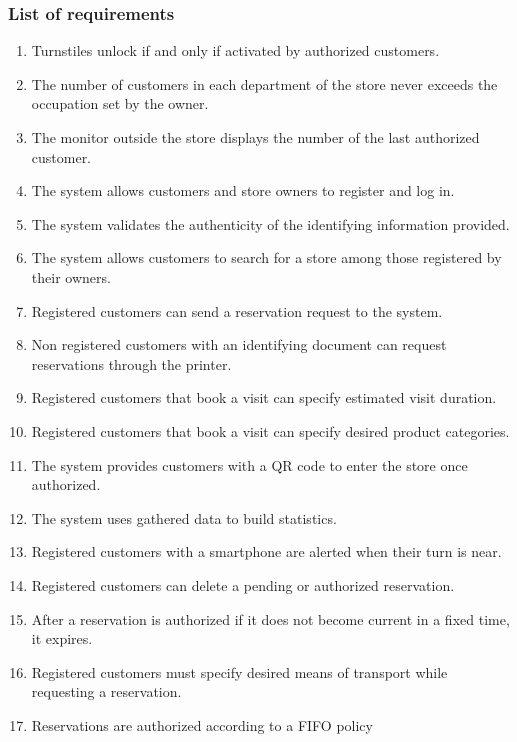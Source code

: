 \subsubsection{List of requirements}
\begin{enumerate}[label=R\arabic*]
	\item Turnstiles unlock if and only if activated by authorized customers.
	\item The number of customers in each department of the store never exceeds the occupation set by the owner.
	\item The monitor outside the store displays the number of the last authorized customer.
	\item The system allows customers and store owners to register and log in.
	\item The system validates the authenticity of the identifying information provided.
	\item The system allows customers to search for a store among those registered by their owners.
	\item Registered customers can send a reservation request to the system.
	\item Non registered customers with an identifying document can request reservations through the printer.
	\item Registered customers that book a visit can specify estimated visit duration.
	\item Registered customers that book a visit can specify desired product categories.
	\item The system provides customers with a QR code to enter the store once authorized.
	\item The system uses gathered data to build statistics. %
	\item Registered customers with a smartphone are alerted when their turn is near.

	\item Registered customers can delete a pending or authorized reservation.
	\item After a reservation is authorized if it does not become current in a fixed time, it expires.
	\item Registered customers must specify desired means of transport while requesting a reservation.
	\item Reservations are authorized according to a FIFO policy 

	
\end{enumerate}
